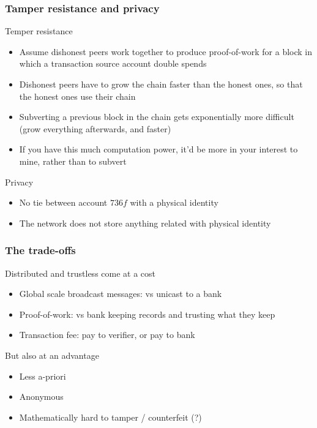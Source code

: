 \documentclass{beamer}
\begin{document}
\begin{frame}
\frametitle{Tamper resistance and privacy}

Temper resistance
\begin{itemize}
  \item Assume dishonest peers work together to produce proof-of-work for a block in which a transaction source account double spends
  \item Dishonest peers have to grow the chain faster than the honest ones, so that the honest ones use their chain
  \item Subverting a previous block in the chain gets exponentially more difficult (grow everything afterwards, and faster)
  \item If you have this much computation power, it'd be more in your interest to mine, rather than to subvert
\end{itemize}

\vspace{0.2in}
Privacy
\begin{itemize}
  \item No tie between account $736f$ with a physical identity
  \item The network does not store anything related with physical identity
\end{itemize}

\end{frame}

\begin{frame}
\frametitle{The trade-offs}

Distributed and trustless come at a cost

\begin{itemize}
  \item Global scale broadcast messages: vs unicast to a bank
  \item Proof-of-work: vs bank keeping records and trusting what they keep
  \item Transaction fee: pay to verifier, or pay to bank
\end{itemize}

\vspace{0.2in}
But also at an advantage

\begin{itemize}
  \item Less a-priori
  \item Anonymous
  \item Mathematically hard to tamper / counterfeit (?)
\end{itemize}

\end{frame}
\end{document}
